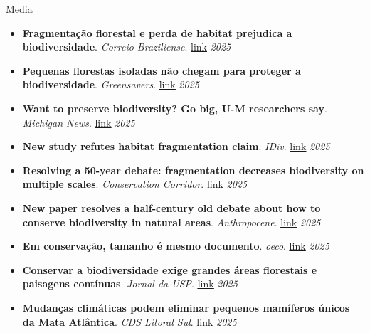 \documentclass{resume}
\begin{document}
\begin{rSection}{Media}
\begin{itemize}
\item {\bf Fragmentação florestal e perda de habitat prejudica a biodiversidade}. {\it Correio Braziliense}. \href{https://www.correiobraziliense.com.br/ciencia-e-saude/2025/03/7082545-fragmentacao-florestal-e-perda-de-habitat-prejudica-a-biodiversidade.html}{\underline{link}} \hfill{\em 2025}
\item {\bf Pequenas florestas isoladas não chegam para proteger a biodiversidade}. {\it Greensavers}. \href{https://greensavers.sapo.pt/pequenas-florestas-isoladas-nao-chegam-para-proteger-a-biodiversidade/}{\underline{link}} \hfill{\em 2025}
\item {\bf Want to preserve biodiversity? Go big, U-M researchers say}. {\it Michigan News}. \href{https://news.umich.edu/want-to-preserve-biodiversity-go-big-u-m-researchers-say/}{\underline{link}} \hfill{\em 2025}
\item {\bf New study refutes habitat fragmentation claim}. {\it IDiv}. \href{https://www.idiv.de/new-study-refutes-habitat-fragmentation-claim}{\underline{link}} \hfill{\em 2025}
\item {\bf Resolving a 50-year debate: fragmentation decreases biodiversity on multiple scales}. {\it Conservation Corridor}. \href{https://conservationcorridor.org/digests/2025/03/resolving-a-50-year-debate-fragmentation-decreases-biodiversity-on-multiple-scales/}{\underline{link}} \hfill{\em 2025}
\item {\bf New paper resolves a half-century old debate about how to conserve biodiversity in natural areas}. {\it Anthropocene}. \href{https://www.anthropocenemagazine.org/2025/03/new-paper-resolves-a-half-century-old-debate-about-how-to-conserve-biodiversity-in-natural-areas/}{\underline{link}} \hfill{\em 2025}
\item {\bf Em conservação, tamanho é mesmo documento}. {\it oeco}. \href{https://oeco.org.br/noticias/em-conservacao-tamanho-e-mesmo-documento/}{\underline{link}} \hfill{\em 2025}
\item {\bf Conservar a biodiversidade exige grandes áreas florestais e paisagens contínuas}. {\it Jornal da USP}. \href{https://jornal.usp.br/ciencias/conservar-a-biodiversidade-exige-grandes-areas-florestais-e-paisagens-continuas/}{\underline{link}} \hfill{\em 2025}
\item {\bf Mudanças climáticas podem eliminar pequenos mamíferos únicos da Mata Atlântica}. {\it CDS Litoral Sul}. \href{https://www.cdslitoralsul.ba.gov.br/Site/Noticias/mudanas-climticas-podem-eliminar-pequenos-mamferos-nicos-da-mata-atlntica-}{\underline{link}} \hfill{\em 2025}

\end{itemize}
\end{rSection}
\end{document}
